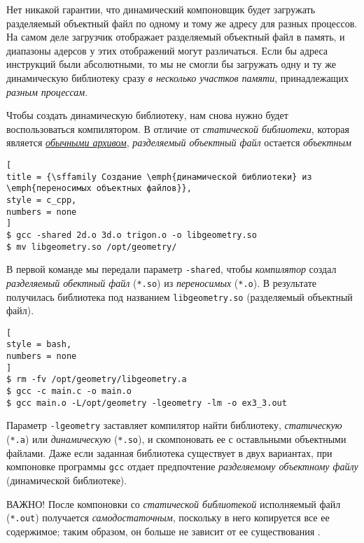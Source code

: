 \documentclass[%
	11pt,
	a4paper,
	utf8,
		]{article}
\begin{document}
Нет никакой гарантии, что динамический компоновщик будет загружать разделяемый объектный файл по одному и тому же адресу для разных процессов. На самом деле загрузчик отображает разделяемый объектный файл в память, и диапазоны адерсов у этих отображений могут различаться. Если бы адреса инструкций были абсолютными, то мы не смогли бы загружать одну и ту же динамическую библиотеку сразу \emph{в несколько участков памяти}, принадлежащих \emph{разным процессам}.

Чтобы создать динамическую библиотеку, нам снова нужно будет воспользоваться компилятором. В отличие от \emph{статической библиотеки}, которая является \underline{\itshape обычными архивом}, \emph{разделяемый объектный файл} остается \emph{объектным} \cite[]{amini-extreme-c:2022}
\begin{lstlisting}[
title = {\sffamily Создание \emph{динамической библиотеки} из \emph{переносимых объектных файлов}},
style = c_cpp,
numbers = none
]
$ gcc -shared 2d.o 3d.o trigon.o -o libgeometry.so
$ mv libgeometry.so /opt/geometry/
\end{lstlisting}

В первой команде мы передали параметр \verb|-shared|, чтобы \emph{компилятор} создал \emph{разделяемый обектный файл} (\verb|*.so|) из \emph{переносимых} (\verb|*.o|). В результате получилась библиотека под названием \verb|libgeometry.so| (разделяемый объектный файл). 


\begin{lstlisting}[
style = bash,
numbers = none
]
$ rm -fv /opt/geometry/libgeometry.a
$ gcc -c main.c -o main.o
$ gcc main.o -L/opt/geometry -lgeometry -lm -o ex3_3.out
\end{lstlisting}

Параметр \verb|-lgeometry| заставляет компилятор найти библиотеку, \emph{статическую} (\verb|*.a|) или \emph{динамическую} (\verb|*.so|), и скомпоновать ее с оставльными объектными файлами. Даже если заданная библиотека существует в двух вариантах, при компоновке программы \verb|gcc| отдает предпочтение \emph{разделяемому объектному файлу} (динамической библиотеке).

ВАЖНО! После компоновки со \emph{статической библиотекой} исполняемый файл (\verb|*.out|) получается \emph{самодостаточным}, поскольку в него копируется все ее содержимое; таким образом, он больше не зависит от ее существования \cite[]{amini-extreme-c:2022}.
\end{document}
